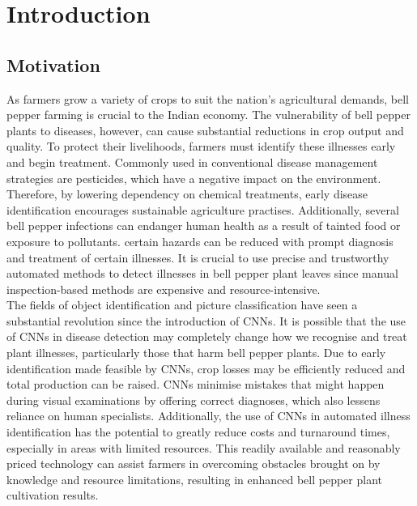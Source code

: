 \documentclass[conference]{IEEEtran}
\begin{document}
\IEEEpeerreviewmaketitle



\section{Introduction}



\subsection{Motivation}
As farmers grow a variety of crops to suit the nation's agricultural demands, bell pepper farming is crucial to the Indian economy. The vulnerability of bell pepper plants to diseases, however, can cause substantial reductions in crop output and quality. To protect their livelihoods, farmers must identify these illnesses early and begin treatment. Commonly used in conventional disease management strategies are pesticides, which have a negative impact on the environment. Therefore, by lowering dependency on chemical treatments, early disease identification encourages sustainable agriculture practises. Additionally, several bell pepper infections can endanger human health as a result of tainted food or exposure to pollutants. certain hazards can be reduced with prompt diagnosis and treatment of certain illnesses. It is crucial to use precise and trustworthy automated methods to detect illnesses in bell pepper plant leaves since manual inspection-based methods are expensive and resource-intensive. \\ 

The fields of object identification and picture classification have seen a substantial revolution since the introduction of CNNs. It is possible that the use of CNNs in disease detection may completely change how we recognise and treat plant illnesses, particularly those that harm bell pepper plants. Due to early identification made feasible by CNNs, crop losses may be efficiently reduced and total production can be raised. CNNs minimise mistakes that might happen during visual examinations by offering correct diagnoses, which also lessens reliance on human specialists. Additionally, the use of CNNs in automated illness identification has the potential to greatly reduce costs and turnaround times, especially in areas with limited resources. This readily available and reasonably priced technology can assist farmers in overcoming obstacles brought on by knowledge and resource limitations, resulting in enhanced bell pepper plant cultivation results.\\ 
\end{document}
